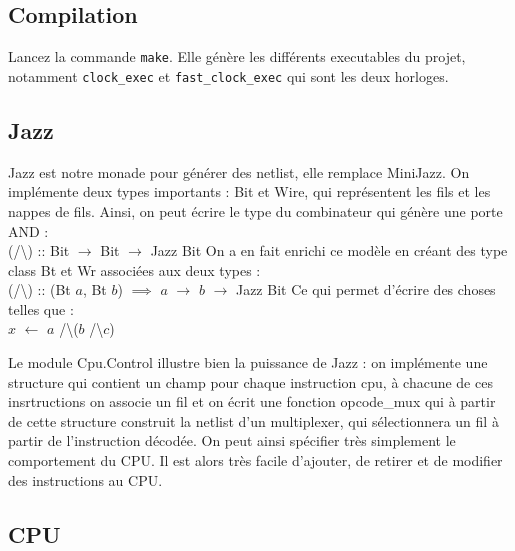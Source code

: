 \subsection{Compilation}

Lancez la commande \texttt{make}.
Elle génère les différents executables du projet,
notamment \texttt{clock\_exec} et \texttt{fast\_clock\_exec} qui sont les deux horloges.

\subsection{Jazz}

Jazz est notre monade pour générer des netlist, elle remplace MiniJazz.
On implémente deux types importants : Bit et Wire, qui représentent les fils et les nappes de fils.
Ainsi, on peut écrire le type du combinateur qui génère une porte AND :\\
  (/\textbackslash) {\hspace{0.5em}}:{\hspace{-1em}}:{\hspace{0.5em}} Bit $\rightarrow$ Bit $\rightarrow$ Jazz Bit
\newline
On a en fait enrichi ce modèle en créant des type class Bt et Wr associées aux deux types :\\
  (/\textbackslash) {\hspace{0.5em}}:{\hspace{-1em}}:{\hspace{0.5em}} (Bt $a$, Bt $b$) $\implies$ $a$ $\rightarrow$ $b$ $\rightarrow$ Jazz Bit
\newline
Ce qui permet d'écrire des choses telles que :\\
  $x$ $\leftarrow$ $a$ /\textbackslash ($b$ /\textbackslash $c$)

Le module Cpu.Control illustre bien la puissance de Jazz :
on implémente une structure qui contient un champ pour chaque instruction cpu,
à chacune de ces insrtructions on associe un fil et on écrit une fonction opcode\_mux qui
à partir de cette structure construit la netlist d'un multiplexer, qui sélectionnera un fil
à partir de l'instruction décodée.
On peut ainsi spécifier très simplement le comportement du CPU.
Il est alors très facile d'ajouter, de retirer et de modifier des instructions au CPU.

\subsection{CPU}

